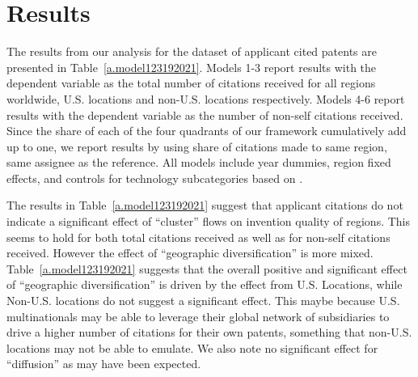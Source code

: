 \documentclass[12pt,letterpaper]{article}
\begin{document}




%
%
%


\section{Results}
The  results from our analysis for the dataset of applicant  cited patents are presented in Table~\ref{a.model123192021}. Models 1-3 report results with the dependent variable as the total number of citations received for all regions worldwide, U.S. locations and non-U.S. locations respectively. Models 4-6 report results with the dependent variable as the number of non-self citations received. Since the share of each of the four quadrants of our framework cumulatively add up to one, we report results by using share of citations made to same region, same assignee as the reference. All models include year dummies, region fixed effects, and controls for technology subcategories based on \cite*{Hall2001a}. \par


The results in Table~\ref{a.model123192021} suggest that applicant citations do not indicate a significant effect of ``cluster'' flows on invention quality of regions. This seems to hold for both total citations received as well as for non-self citations received. However the effect of ``geographic diversification'' is more mixed. Table~\ref{a.model123192021} suggests that the overall positive and significant effect of ``geographic diversification'' is driven by the effect from U.S. Locations, while Non-U.S. locations do not suggest a significant effect. This maybe because U.S. multinationals may be able to leverage their global network of subsidiaries to drive a higher number of citations for their own patents, something that non-U.S. locations may not be able to emulate. We also note no significant effect for ``diffusion'' as may have been expected.


\end{document}
